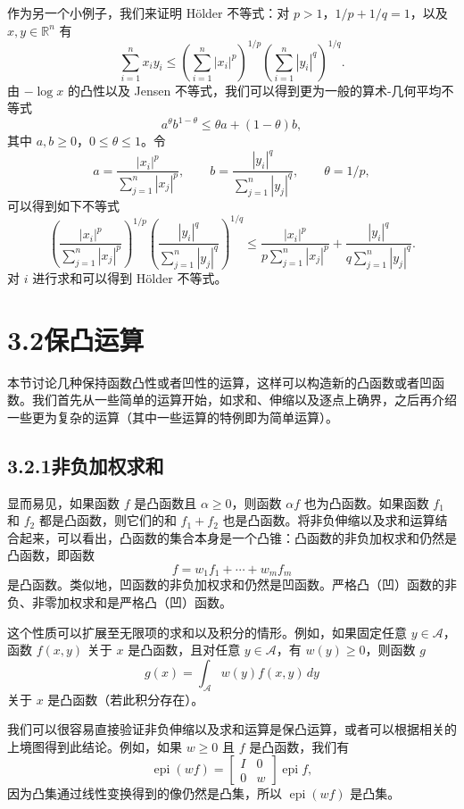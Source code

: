 \documentclass[UTF8,12pt,a4paper,fontset=fandol]{ctexart}
\DeclareMathOperator{\epi}{epi}
\begin{document}
作为另一个小例子，我们来证明 Hölder 不等式：对 $p>1$，$1/p+1/q=1$，以及 $x,y\in\mathbb{R}^n$ 有
\[
\sum_{i=1}^n x_i y_i
\leq
\left(\sum_{i=1}^n |x_i|^p\right)^{1/p}
\left(\sum_{i=1}^n |y_i|^q\right)^{1/q}.
\]
由 $-\log x$ 的凸性以及 Jensen 不等式，我们可以得到更为一般的算术-几何平均不等式
\[
a^\theta b^{1-\theta}\leq \theta a+(1-\theta)b,
\]
其中 $a,b\geq0$，$0\leq\theta\leq1$。令
\[
a=\frac{|x_i|^p}{\sum_{j=1}^n |x_j|^p},\qquad
b=\frac{|y_i|^q}{\sum_{j=1}^n |y_j|^q},\qquad
\theta=1/p,
\]
可以得到如下不等式
\[
\left(
\frac{|x_i|^p}{\sum_{j=1}^n |x_j|^p}
\right)^{1/p}
\left(
\frac{|y_i|^q}{\sum_{j=1}^n |y_j|^q}
\right)^{1/q}
\leq
\frac{|x_i|^p}{p\sum_{j=1}^n |x_j|^p}
+
\frac{|y_i|^q}{q\sum_{j=1}^n |y_j|^q}.
\]
对 $i$ 进行求和可以得到 Hölder 不等式。

\section*{3.2\quad 保凸运算}

本节讨论几种保持函数凸性或者凹性的运算，这样可以构造新的凸函数或者凹函数。我们首先从一些简单的运算开始，如求和、伸缩以及逐点上确界，之后再介绍一些更为复杂的运算（其中一些运算的特例即为简单运算）。

\subsection*{3.2.1\quad 非负加权求和}

显而易见，如果函数 $f$ 是凸函数且 $\alpha\geq0$，则函数 $\alpha f$ 也为凸函数。如果函数 $f_1$ 和 $f_2$ 都是凸函数，则它们的和 $f_1+f_2$ 也是凸函数。将非负伸缩以及求和运算结合起来，可以看出，凸函数的集合本身是一个凸锥：凸函数的非负加权求和仍然是凸函数，即函数
\[
f=w_1f_1+\cdots+w_mf_m
\]
是凸函数。类似地，凹函数的非负加权求和仍然是凹函数。严格凸（凹）函数的非负、非零加权求和是严格凸（凹）函数。

这个性质可以扩展至无限项的求和以及积分的情形。例如，如果固定任意 $y\in\mathcal{A}$，函数 $f(x,y)$ 关于 $x$ 是凸函数，且对任意 $y\in\mathcal{A}$，有 $w(y)\geq0$，则函数 $g$
\[
g(x)=\int_{\mathcal{A}} w(y)f(x,y)\,dy
\]
关于 $x$ 是凸函数（若此积分存在）。

我们可以很容易直接验证非负伸缩以及求和运算是保凸运算，或者可以根据相关的上境图得到此结论。例如，如果 $w\geq0$ 且 $f$ 是凸函数，我们有
\[
\epi(wf)=
\begin{bmatrix}
I & 0\\
0 & w
\end{bmatrix}
\epi f,
\]
因为凸集通过线性变换得到的像仍然是凸集，所以 $\epi(wf)$ 是凸集。
\end{document}

